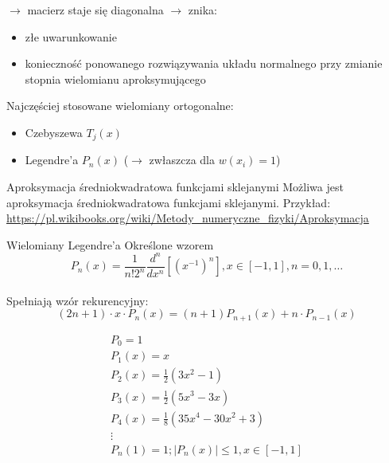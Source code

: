 \begin{frame}
	$\rightarrow$ macierz staje się diagonalna $\rightarrow$ znika:
    \begin{itemize}
    \item złe uwarunkowanie
    \item konieczność ponowanego rozwiązywania układu normalnego przy zmianie stopnia wielomianu aproksymującego
    \end{itemize}
	Najczęściej stosowane wielomiany ortogonalne:
    \begin{itemize}
    \item Czebyszewa $T_j(x)$
    \item Legendre'a $P_n(x)$ ($\rightarrow$ zwłaszcza dla $w(x_i) = 1$)
    \end{itemize}
\end{frame}
\begin{frame}{Aproksymacja średniokwadratowa funkcjami sklejanymi}
	Możliwa jest aproksymacja średniokwadratowa funkcjami sklejanymi.\newline
    Przykład: \url{https://pl.wikibooks.org/wiki/Metody_numeryczne_fizyki/Aproksymacja}
\end{frame}
\begin{frame}{Wielomiany Legendre'a}
	Określone wzorem $$P_n(x) = \frac{1}{n!2^n}\frac{d^n}{dx^n}[(x^{-1})^n],x \in [-1,1], n = 0,1,\ldots$$\\
    Spełniają wzór rekurencyjny:
    $$(2n+1) \cdot x \cdot P_n(x)=(n+1)P_{n+1}(x)+n \cdot P_{n-1}(x)$$
    \begin{flushleft}
    	$$\left.\begin{array}{l}
    P_0 = 1 \\
    P_1(x) = x \\
    P_2(x) = \frac{1}{2}(3x^2-1)\\
    P_3(x) = \frac{1}{2}(5x^3-3x) \\
    P_4(x) = \frac{1}{8}(35x^4-30x^2+3)\\
    \vdots \\
    P_n(1) = 1; |P_n(x)| \leqslant 1, x \in [-1,1]
    \end{array}\right.$$
    \end{flushleft}
\end{frame}
